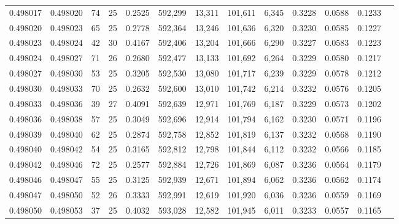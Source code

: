 \begin{tabular}{rrrrrrrrrrrrr}
0.498017 & 0.498020 &  74 &  25 &                                     0.2525 & 592,299 &  13,311 & 101,611 &   6,345 & 0.3228 & 0.0588 & 0.1233 \\
0.498020 & 0.498023 &  65 &  25 &                                     0.2778 & 592,364 &  13,246 & 101,636 &   6,320 & 0.3230 & 0.0585 & 0.1227 \\
0.498023 & 0.498024 &  42 &  30 &                                     0.4167 & 592,406 &  13,204 & 101,666 &   6,290 & 0.3227 & 0.0583 & 0.1223 \\
0.498024 & 0.498027 &  71 &  26 &                                     0.2680 & 592,477 &  13,133 & 101,692 &   6,264 & 0.3229 & 0.0580 & 0.1217 \\
0.498027 & 0.498030 &  53 &  25 &                                     0.3205 & 592,530 &  13,080 & 101,717 &   6,239 & 0.3229 & 0.0578 & 0.1212 \\
0.498030 & 0.498033 &  70 &  25 &                                     0.2632 & 592,600 &  13,010 & 101,742 &   6,214 & 0.3232 & 0.0576 & 0.1205 \\
0.498033 & 0.498036 &  39 &  27 &                                     0.4091 & 592,639 &  12,971 & 101,769 &   6,187 & 0.3229 & 0.0573 & 0.1202 \\
0.498036 & 0.498038 &  57 &  25 &                                     0.3049 & 592,696 &  12,914 & 101,794 &   6,162 & 0.3230 & 0.0571 & 0.1196 \\
0.498039 & 0.498040 &  62 &  25 &                                     0.2874 & 592,758 &  12,852 & 101,819 &   6,137 & 0.3232 & 0.0568 & 0.1190 \\
0.498040 & 0.498042 &  54 &  25 &                                     0.3165 & 592,812 &  12,798 & 101,844 &   6,112 & 0.3232 & 0.0566 & 0.1185 \\
0.498042 & 0.498046 &  72 &  25 &                                     0.2577 & 592,884 &  12,726 & 101,869 &   6,087 & 0.3236 & 0.0564 & 0.1179 \\
0.498046 & 0.498047 &  55 &  25 &                                     0.3125 & 592,939 &  12,671 & 101,894 &   6,062 & 0.3236 & 0.0562 & 0.1174 \\
0.498047 & 0.498050 &  52 &  26 &                                     0.3333 & 592,991 &  12,619 & 101,920 &   6,036 & 0.3236 & 0.0559 & 0.1169 \\
0.498050 & 0.498053 &  37 &  25 &                                     0.4032 & 593,028 &  12,582 & 101,945 &   6,011 & 0.3233 & 0.0557 & 0.1165 \\

\end{tabular}
